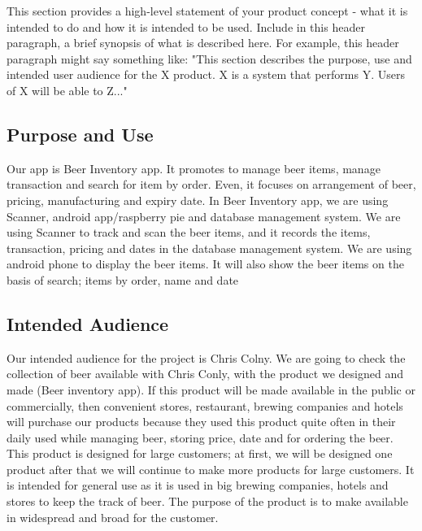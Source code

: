 This section provides a high-level statement of your product concept - what it is intended to do and how it is intended to be used. Include in this header paragraph, a brief synopsis of what is described here. For example, this header paragraph might say something like: "This section describes the purpose, use and intended user audience for the X product. X is a system that performs Y. Users of X will be able to Z..."

\subsection{Purpose and Use}
Our app is Beer Inventory app. It promotes to manage beer items, manage transaction and search for item by order. Even, it focuses on arrangement of beer, pricing, manufacturing and expiry date.  In Beer Inventory app, we are using Scanner, android app/raspberry pie and database management system.  We are using Scanner to track and scan the beer items, and it records the items, transaction, pricing and dates in the database management system. We are using android phone to display the beer items. It will also show the beer items on the basis of search; items by order, name and date

\subsection{Intended Audience}
Our intended audience for the project is Chris Colny. We are going to check the collection of beer available with Chris Conly, with the product we designed and made (Beer inventory app). If this product will be made available in the public or commercially, then convenient stores, restaurant, brewing companies and hotels will purchase our products because they used this product quite often in their daily used while managing beer, storing price, date and for ordering the beer. This product is designed for large customers; at first, we will be designed one product after that we will continue to make more products for large customers. It is intended for general use as it is used in big brewing companies, hotels and stores to keep the track of beer. The purpose of the product is to make available in widespread and broad for the customer.

